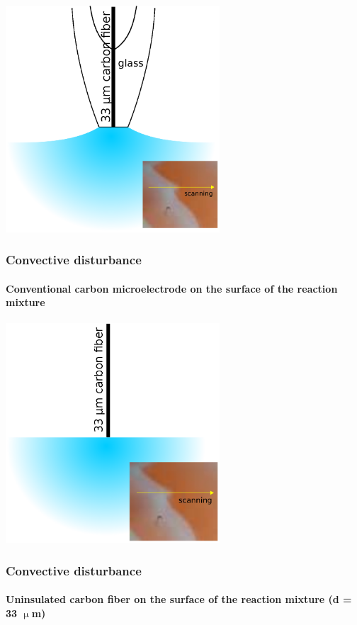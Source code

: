 \documentclass{beamer}
\begin{document}
\begin{frame}
	\centering
	\includegraphics[width=0.6\textwidth]{szigeteles2.eps}
	\frametitle{Convective disturbance}
	\framesubtitle{Conventional carbon microelectrode on the surface of the reaction mixture}
\end{frame}

\begin{frame}
	\centering
	\includegraphics[width=0.6\textwidth]{szigeteles3.eps}
	\frametitle{Convective disturbance}
	\framesubtitle{Uninsulated carbon fiber on the surface of the reaction mixture (d = 33 $\upmu$m)}
\end{frame}
\end{document}
